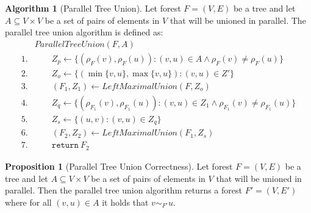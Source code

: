 \documentclass[a4paper,12pt]{article}
\theoremstyle{definition}
\newtheorem{proposition}{Proposition}[section]
\newtheorem{algorithm}{Algorithm}[section]
\newcommand{\id}[1]{\ensuremath{\mathit{#1}}}
\newcommand{\kw}[1]{\ensuremath{\mathtt{#1}}}
\begin{document}
\begin{algorithm}[Parallel Tree Union]
    Let forest $F = (V, E)$ be a tree and let $A \subseteq V \times V$ be a set of pairs
    of elements in $V$ that will be unioned in parallel. The parallel tree union
    algorithm is defined as:
    \begin{align*}
        & \id{ParallelTreeUnion}(F, A) \\
        1. & \qquad Z_p \leftarrow \{(\rho_F(v), \rho_F(u)) : (v, u) \in A \land \rho_F(v) \neq \rho_F(u)\} \\
        2. & \qquad Z_o \leftarrow \{(\min \{v, u\}, \max \{v, u\}) : (v, u) \in Z'\} \\
        3. & \qquad (F_1, Z_1) \leftarrow \id{LeftMaximalUnion}(F, Z_o) \\
        4. & \qquad Z_q \leftarrow \{(\rho_{F_1}(v), \rho_{F_1}(u)) : (v, u) \in Z_1 \land \rho_{F_1}(v) \neq \rho_{F_1}(u)\} \\
        5. & \qquad Z_s \leftarrow \{(u, v) : (v, u) \in Z_q\} \\
        6. & \qquad (F_2, Z_2) \leftarrow \id{LeftMaximalUnion}(F_1, Z_s) \\
        7. & \qquad \kw{return} \: F_2
    \end{align*}
\end{algorithm}

\begin{proposition}[Parallel Tree Union Correctness]
    Let forest $F = (V, E)$ be a tree and let $A \subseteq V \times V$ be a set of pairs
    of elements in $V$ that will be unioned in parallel. Then the parallel tree union
    algorithm returns a forest $F' = (V, E')$ where for all $(v, u) \in A$ it holds that
    $v \sim_{F'} u$.
\end{proposition}
\end{document}
